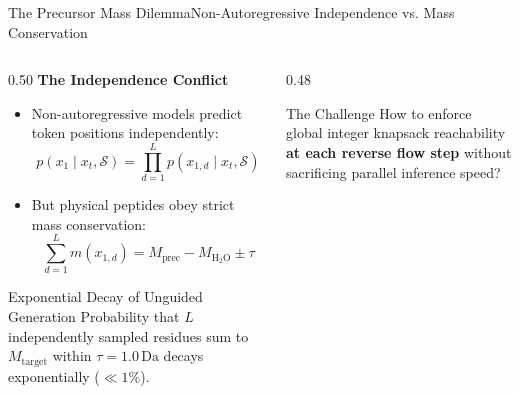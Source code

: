\documentclass[aspectratio=169, 10pt]{beamer}
\begin{document}
\begin{frame}{The Precursor Mass Dilemma}{Non-Autoregressive Independence vs. Mass Conservation}
\begin{columns}[T]
\begin{column}{0.50\textwidth}
  \textbf{\footnotesize The Independence Conflict}
  \begin{itemize}\setlength{\itemsep}{2pt}\scriptsize
    \item Non-autoregressive models predict token positions independently:
    \begin{equation*}
      p(x_1 \mid x_t, \mathcal{S}) = \prod_{d=1}^L p(x_{1, d} \mid x_t, \mathcal{S})
    \end{equation*}
    \item But physical peptides obey strict mass conservation:
    \begin{equation*}
      \sum_{d=1}^L m(x_{1, d}) = M_{\text{prec}} - M_{\text{H}_2\text{O}} \pm \tau
    \end{equation*}
  \end{itemize}
  \vspace{0.05cm}
  \begin{alertblock}{\scriptsize Exponential Decay of Unguided Generation}
    \tiny
    Probability that $L$ independently sampled residues sum to $M_{\text{target}}$ within $\tau = 1.0\,\text{Da}$ decays exponentially ($\ll 1\%$).
  \end{alertblock}
\end{column}

\begin{column}{0.48\textwidth}
  \vspace{0.15cm}
  \begin{exampleblock}{\scriptsize The Challenge}
    \scriptsize
    How to enforce global integer knapsack reachability \textbf{at each reverse flow step} without sacrificing parallel inference speed?
  \end{exampleblock}
\end{column}
\end{columns}
\end{frame}
\end{document}
